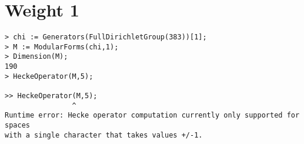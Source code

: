 \documentclass[11pt]{amsart}
\numberwithin{equation}{subsection}
\theoremstyle{definition}
\begin{document}
\section{Weight 1}

\begin{verbatim}
> chi := Generators(FullDirichletGroup(383))[1];
> M := ModularForms(chi,1);
> Dimension(M);
190
> HeckeOperator(M,5);

>> HeckeOperator(M,5);
                ^
Runtime error: Hecke operator computation currently only supported for spaces 
with a single character that takes values +/-1.
\end{verbatim}

\begin{thebibliography}{999}

\end{thebibliography}
\end{document}
